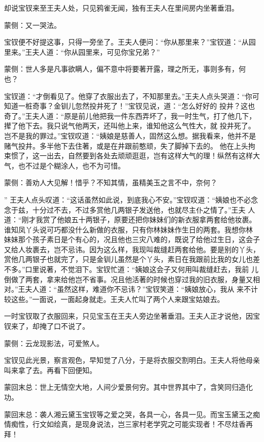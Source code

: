 \begin{parag}
    却说宝钗来至王夫人处，只见鸦雀无闻，独有王夫人在里间房内坐著垂泪。\begin{note}蒙侧：又一哭法。\end{note}宝钗便不好提这事，只得一旁坐了。王夫人便问：“你从那里来？”宝钗道：“从园里来。”王夫人道：“你从园里来，可见你宝兄弟？”\begin{note}蒙侧：世人多是凡事欲瞒人，偏不意中将要著开露，理之所无，事则多有，何 也？\end{note}宝钗道：“才倒看见了。他穿了衣服出去了，不知那里去。”王夫人点头哭道：“你可知道一桩奇事？金钏儿忽然投井死了！”宝钗见说，道：“怎么好好的 投井？这也奇了。”王夫人道：“原是前儿他把我一件东西弄坏了，我一时生气，打了他几下，撵了他下去。我只说气他两天，还叫他上来，谁知他这么气性大，就 投井死了。岂不是我的罪过。”宝钗叹道：“姨娘是慈善人，固然这么想。据我看来，他并不是赌气投井。多半他下去住著，或是在井跟前憨顽，失了脚掉下去的。 他在上头拘束惯了，这一出去，自然要到各处去顽顽逛逛，岂有这样大气的理！纵然有这样大气，也不过是个糊涂人，也不为可惜。\begin{note}蒙侧：善劝人大见解！惜乎？不知其情，虽精美玉之言不中，奈何？\end{note}” 王夫人点头叹道：“这话虽然如此说，到底我心不安。”宝钗叹道：“姨娘也不必念念于兹，十分过不去，不过多赏他几两银子发送他，也就尽主仆之情了。”王夫 人道：“刚才我赏了他娘五十两银子，原要还把你妹妹们的新衣服拿两套给他妆裹。谁知凤丫头说可巧都没什么新做的衣服，只有你林妹妹作生日的两套。我想你林 妹妹那个孩子素日是个有心的，况且他也三灾八难的，既说了给他过生日，这会子又给人妆裹去，岂不忌讳。因为这么样，我现叫裁缝赶两套给他。要是别的丫头， 赏他几两银子也就完了，只是金钏儿虽然是个丫头，素日在我跟前比我的女儿也差不多。”口里说著，不觉泪下。宝钗忙道：“姨娘这会子又何用叫裁缝赶去，我前 儿倒做了两套，拿来给他岂不省事。况且他活著的时候也穿过我的旧衣服，身量又相对。”王夫人道：“虽然这样，难道你不忌讳？”宝钗笑道：“姨娘放心，我从 来不计较这些。”一面说，一面起身就走。王夫人忙叫了两个人来跟宝姑娘去。
\end{parag}


\begin{parag}
    一时宝钗取了衣服回来，只见宝玉在王夫人旁边坐著垂泪。王夫人正才说他，因宝钗来了，却掩了口不说了。\begin{note}蒙侧：云龙现影法，可爱煞人。\end{note}宝钗见此光景，察言观色，早知觉了八分，于是将衣服交割明白。王夫人将他母亲叫来拿了去。再看下回便知。
\end{parag}


\begin{parag}
    \begin{note}蒙回末总：世上无情空大地，人间少爱景何穷。其中世界其中了，含笑同归造化功。\end{note}
\end{parag}


\begin{parag}
    \begin{note}蒙回末总：袭人湘云黛玉宝钗等之爱之哭，各具一心，各具一见。而宝玉黛玉之痴情痴性，行文如绘真，是现身说法，岂三家村老学究之可能实现者！不尽炷香再拜！\end{note}
\end{parag}

